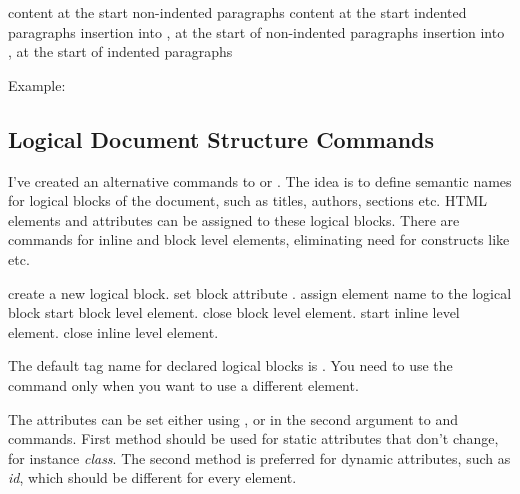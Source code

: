 \begin{texsource}
{\ifvmode\IgnorePar\fi\EndP
 \par\ShowPar}
{\ifvmode\IgnorePar\fi\EndP
 }
\end{texsource}


 {content at the start non-indented paragraphs} 
   {content at the start indented paragraphs}
   {insertion into , at the start of non-indented paragraphs}
   {insertion into , at the start of indented paragraphs}\EndDoc

Example:

\begin{texsource}
{\EndP{}}
{\EndP{}}
{}
{}
\end{texsource}



\subsection{Logical Document Structure Commands}
I've created an alternative commands to  or . 
The idea is to define semantic names for logical blocks of the document, such as titles, authors,
sections etc. HTML elements and attributes can be assigned to these
logical blocks. There are commands for inline and block level elements,
eliminating need for constructs like \texcommand{\ifvmode\IgnorePar\fi\EndP}
etc.

 create a new logical block.
 set block attribute .
 assign element name to the logical block
 start block level element.
 close block level element.
 start inline level element.
 close inline level element.


The default tag name for declared logical blocks is . You
need to use the  command only when you want to use a different
element.

The attributes can be set either using , or in the second
argument to   and  commands. First method should be
used for static attributes that don't change, for instance \textit{class}. The second method
is preferred for dynamic attributes, such as \textit{id}, which should be different for 
every element.

